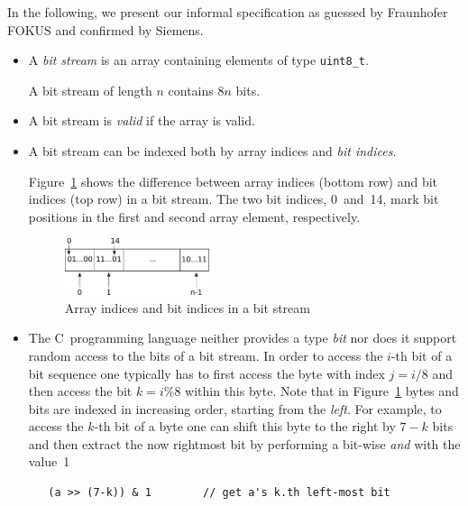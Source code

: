 

In the following, we present our informal 
specification as guessed by Fraunhofer
FOKUS and confirmed by Siemens.

\begin{itemize}
\item
A \emph{bit stream} is an array containing elements of type \verb"uint8_t".

A bit stream of length $n$ contains $8n$ bits.

\item
A bit stream is \emph{valid} if the array is valid.

\item 
A bit stream can be indexed both by array indices
and \emph{bit indices}.

Figure~\ref{fig:bitstream-indices} shows the difference between 
array indices (bottom row) and bit indices (top row) in a bit stream.
The two bit indices, 0~and~14,
mark bit positions in the first and second array element, respectively.

\begin{figure}[hbt]
\begin{center}
\includegraphics[width=0.40\textwidth]{figures/array_as_stream.pdf}
\caption{\label{fig:bitstream-indices} Array indices and bit indices in a bit stream}
\end{center}
\end{figure}

\item 
The C~programming language neither provides a type \emph{bit}
nor does it support random access to the bits of a bit stream.
In order to access the $i$-th bit of a bit sequence one typically
has to first access the byte with index $j = i/8$ and then access the 
bit $k = i \% 8$  within this byte.
Note that in Figure~\ref{fig:bitstream-indices} 
bytes and bits are indexed in increasing order, starting from the \emph{left}.
For example, to access the $k$-th bit of a byte  one can
shift this byte to the right by $7-k$ bits and then extract the now
rightmost bit by performing a bit-wise \emph{and} with the value~1
%
\begin{verbatim}
   (a >> (7-k)) & 1        // get a's k.th left-most bit
\end{verbatim}


\end{itemize}
